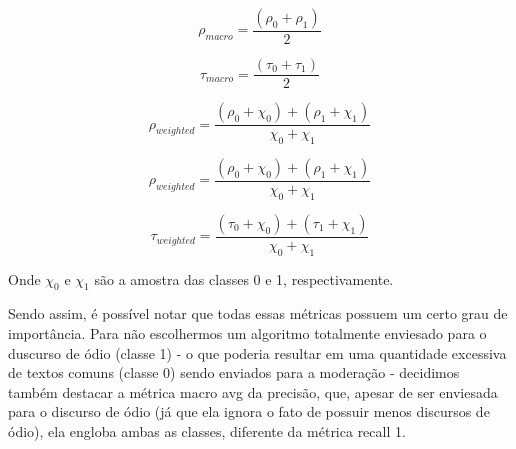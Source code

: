 $$ 
\rho_{macro} = 
\frac{(\rho_0+\rho_1)}{2} 
$$

$$ 
\tau_{macro} = 
\frac{(\tau_0+\tau_1)}{2} 
$$

$$ 
\rho_{weighted} = 
\frac{(\rho_0+\chi_0)+(\rho_1+\chi_1)}{\chi_0+\chi_1} 
$$

$$ 
\rho_{weighted} = 
\frac{(\rho_0+\chi_0)+(\rho_1+\chi_1)}{\chi_0+\chi_1} 
$$

$$ 
\tau_{weighted} = 
\frac{(\tau_0+\chi_0)+(\tau_1+\chi_1)}{\chi_0+\chi_1} 
$$

Onde $\chi_0$  e $\chi_1$ são a amostra das classes 0 e 1, respectivamente.

Sendo assim, é possível notar que todas essas métricas possuem um certo grau de importância. Para não escolhermos um algoritmo totalmente enviesado para o duscurso de ódio (classe 1) - o que poderia resultar em uma quantidade excessiva de textos comuns (classe 0) sendo enviados para a moderação - decidimos também destacar a métrica macro avg da precisão, que, apesar de ser enviesada para o discurso de ódio (já que ela ignora o fato de possuir menos discursos de ódio), ela engloba ambas as classes, diferente da métrica recall 1.